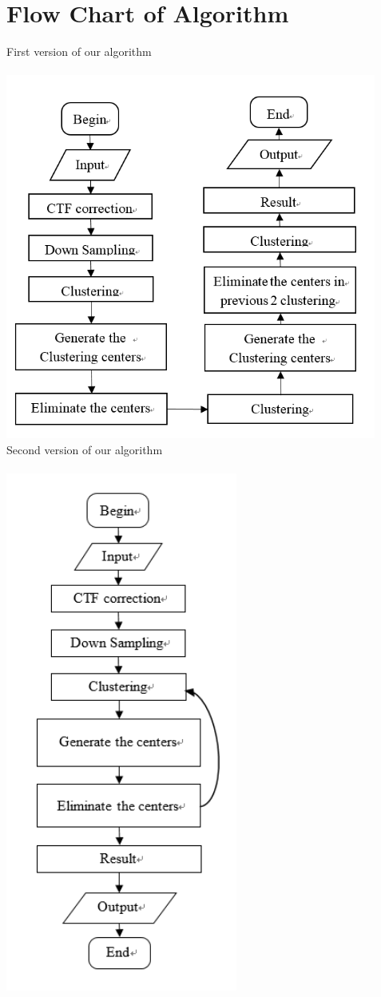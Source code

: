 \documentclass{article}
\begin{document}
\section{Flow Chart of Algorithm}
First version of our algorithm\\
~\\
\includegraphics[width=4.8in]{111}
~\\
Second version of our algorithm\\
~\\
\includegraphics[width=3in]{123}
\end{document}
